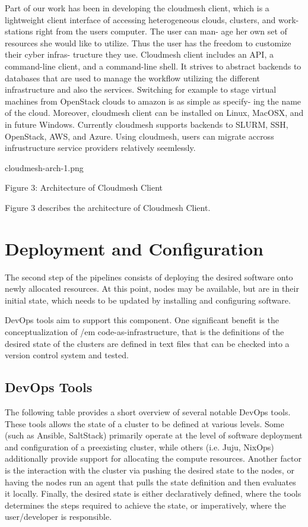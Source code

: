 \documentclass[9pt,twocolumn,twoside]{styles/osajnl}
\begin{document}
Part of our work has been in developing the cloudmesh client, which is a lightweight client interface of accessing heterogeneous clouds, clusters, and work- stations right from the users computer. The user can man- age her own set of resources she would like to utilize. Thus the user has the freedom to customize their cyber infras- tructure they use. Cloudmesh client includes an API, a command-line client, and a command-line shell. It strives to abstract backends to databases that are used to manage the workflow utilizing the different infrastructure and also the services. Switching for example to stage virtual machines from OpenStack clouds to amazon is as simple as specify- ing the name of the cloud. Moreover, cloudmesh client can be installed on Linux, MacOSX, and in future Windows.  Currently cloudmesh supports backends to SLURM, SSH, OpenStack, AWS, and Azure. Using cloudmesh, users can migrate accross infrustructure service providers relatively seemlessly.


 cloudmesh-arch-1.png 

Figure 3: Architecture of Cloudmesh Client


Figure 3 describes the architecture of Cloudmesh Client.

\section{Deployment and Configuration}

The second step of the pipelines consists of deploying the desired software onto newly allocated resources. At this point, nodes may be available, but are in their initial state, which needs to be updated by installing and configuring software.


DevOps tools aim to support this component. One significant benefit is
the conceptualization of {/em code-as-infrastructure}, that is the
definitions of the desired state of the clusters are defined in text
files that can be checked into a version control system and tested.

\subsection{DevOps Tools}

The following table provides a short overview of several notable DevOps tools. These tools allows the state of a cluster to be defined at various levels. Some (such as Ansible, SaltStack) primarily operate at the level of software deployment and configuration of a preexisting cluster, while others (i.e. Juju, NixOps) additionally provide support for allocating the compute resources. Another factor is the interaction with the cluster via pushing the desired state to the nodes, or having the nodes run an agent that pulls the state definition and then evaluates it locally. Finally, the desired state is either declaratively defined, where the tools determines the steps required to achieve the state, or imperatively, where the user/developer is responsible.
\end{document}
